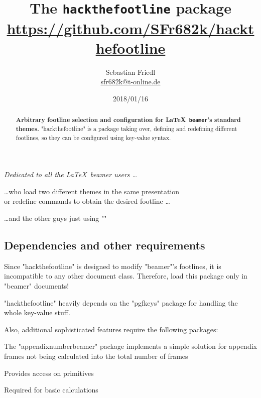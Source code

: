 \documentclass[11pt]{ltxdoc}
\title{The \texttt{\bfseries hackthefootline} package \\ {\large\url{https://github.com/SFr682k/hackthefootline}}}
\author{Sebastian Friedl \\ \href{mailto:sfr682k@t-online.de}{\ttfamily sfr682k@t-online.de}}
\date{2018/01/16}
\begin{document}
	\maketitle
	\thispagestyle{empty}
	
	\begin{center} \itshape
		Dedicated to all the \LaTeX\ beamer users \dots
		
		\medskip
		\dots who load two different themes in the same presentation \\ or redefine commands to obtain the desired footline \dots
		
		\medskip
		\dots and the other guys just using "\setbeamertemplate"
	\end{center}
	
	\medskip
	\begin{abstract}
		\noindent%
		\textbf{Arbitrary footline selection and configuration for \LaTeX\ \texttt{beamer}'s standard themes.}
		"hackthefootline" is a package taking over, defining and redefining different footlines, so they can be configured using key-value syntax.
	\end{abstract}
	
	
	\tableofcontents
	
	\clearpage
	
	
	
	\subsection*{Dependencies and other requirements}
	Since "hackthefootline" is designed to modify "beamer"'s footlines, it is incompatible to any other document class. Therefore, load this package only in "beamer" documents!
	
	\medskip
	"hackthefootline" heavily depends on the "pgfkeys" package for handling the whole key-value stuff.
	
	\bigskip
	Also, additional sophisticated features require the following packages:
	
	\medskip
	The "appendixnumberbeamer" package implements a simple solution for appendix frames not being calculated into the total number of frames
	
	\medskip
	Provides access on  primitives
	
	\medskip
	Required for basic calculations
\end{document}
